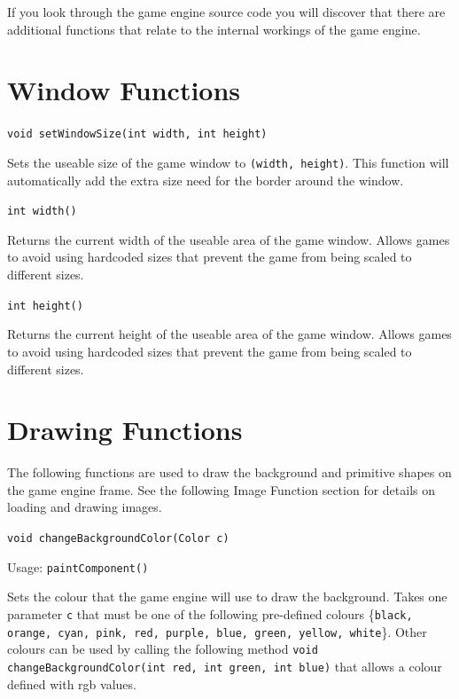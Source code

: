 \documentclass[a4paper, 10pt]{report}
\begin{document}
If you look through the game engine source code you will discover that there are additional functions that relate to the internal workings of the game engine.

\section{Window Functions}

{\large {\tt void setWindowSize(int width, int height)}}

Sets the useable size of the game window to {\tt (width, height)}. This function will automatically add the extra size need for the border around the window.


\hrulefill

{\large {\tt int width()}}

Returns the current width of the useable area of the game window. Allows games to avoid using hardcoded sizes that prevent the game from being scaled to different sizes.

\hrulefill

{\large {\tt int height()}}

Returns the current height of the useable area of the game window. Allows games to avoid using hardcoded sizes that prevent the game from being scaled to different sizes.

\section{Drawing Functions}

The following functions are used to draw the background and primitive shapes on the game engine frame. See the following Image Function section for details on loading and drawing images.

\hrulefill

{\large {\tt void changeBackgroundColor(Color c)}}

Usage: {\tt paintComponent()}

Sets the colour that the game engine will use to draw the background. Takes one parameter {\tt c} that must be one of the following pre-defined colours \{{\tt black, orange, cyan, pink, red, purple, blue, green, yellow, white}\}. Other colours can be used by calling the following method {\tt void changeBackgroundColor(int red, int green, int blue)} that allows a colour defined with rgb values.
\end{document}
